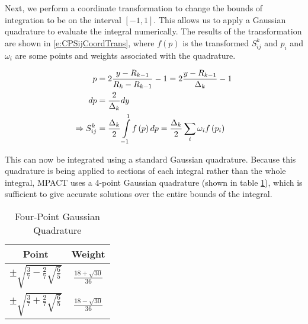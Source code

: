 Next, we perform a coordinate transformation to change the bounds of integration to be on the interval $\left[-1, 1\right]$.  This allows us to apply a Gaussian quadrature to evaluate the integral numerically.  The results of the transformation are shown in \ref{e:CPSijCoordTrans}, where $f\left(p\right)$ is the transformed $S_{ij}^k$ and $p_i$ and $\omega_i$ are some points and weights associated with the quadrature.

\begin{subequations}\label{e:CPSijCoordTrans}
  \begin{align}
  p &= 2\frac{y - R_{k-1}}{R_k - R_{k-1}} - 1 = 2\frac{y - R_{k-1}}{\Delta_k} -1 \\
  dp &= \frac{2}{\Delta_k}dy \\
  \Rightarrow S_{ij}^k &= \frac{\Delta_k}{2} \intop_{-1}^1 f\left(p\right)dp = \frac{\Delta_k}{2} \sum_i \omega_i f\left(p_i\right)
  \end{align}
\end{subequations}

This can now be integrated using a standard Gaussian quadrature.  Because this quadrature is being applied to sections of each integral rather than the whole integral, MPACT uses a 4-point Gaussian quadrature (shown in table \ref{t:gaussQuad}), which is sufficient to give accurate solutions over the entire bounds of the integral.

\begin{table}[h]
  \centering
  \caption{Four-Point Gaussian Quadrature}\label{t:gaussQuad}
  \begin{tabular}{|c|c|}\hline
    Point & Weight \\\hline
    $\pm \sqrt{\frac{3}{7} - \frac{2}{7}\sqrt{\frac{6}{5}}}$ & $\frac{18 + \sqrt{30}}{36}$ \\\hline
    $\pm \sqrt{\frac{3}{7} + \frac{2}{7}\sqrt{\frac{6}{5}}}$ & $\frac{18 - \sqrt{30}}{36}$ \\\hline
  \end{tabular}
\end{table}